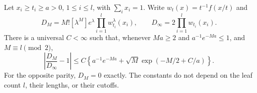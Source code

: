 \documentclass[11pt,letterpaper]{article}
\begin{document}
\begin{proposition}
\label{prop:uniform-relative-coefficient}
Let $x_i\ge t_i\ge a>0$, $1\le i\le l$, with $\sum_i x_i=1$.
Write $w_t(x)=t^{-1}f(x/t)$ and
\[
 D_M=M![\lambda^M]e^\lambda\prod_{i=1}^l w_{t_i}^\lambda(x_i),
 \qquad D_\infty=2\prod_{i=1}^l w_{t_i}(x_i).
\]
There is a universal $C<\infty$ such that, whenever
$Ma\ge2$ and $a^{-1}e^{-Ma}\le1$, and $M\equiv l\pmod2$,
\begin{equation}\label{eq:uniform-relative-coefficient}
 \left|\frac{D_M}{D_\infty}-1\right|
 \le C\left\{a^{-1}e^{-Ma}
                 +\sqrt M\exp(-M/2+C/a)\right\}.
\end{equation}
For the opposite parity, $D_M=0$ exactly. The constants do not
depend on the leaf count $l$, their lengths, or their cutoffs.
\end{proposition}
\end{document}
